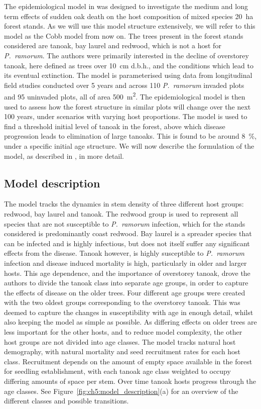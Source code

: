 The epidemiological model in \citet{cobb_ecosystem_2012} was designed to investigate the medium and long term effects of sudden oak death on the host composition of mixed species \SI{20}{\hectare} forest stands. As we will use this model structure extensively, we will refer to this model as the Cobb model from now on. The trees present in the forest stands considered are tanoak, bay laurel and redwood, which is not a host for \textit{P.~ramorum}. The authors were primarily interested in the decline of overstorey tanoak, here defined as trees over \SI{10}{\cm} d.b.h., and the conditions which lead to its eventual extinction. The model is parameterised using data from longitudinal field studies conducted over 5 years and across 110 \textit{P.~ramorum} invaded plots and 95 uninvaded plots, all of area \SI{500}{\metre\squared}. The epidemiological model is then used to assess how the forest structure in similar plots will change over the next 100 years, under scenarios with varying host proportions. The model is used to find a threshold initial level of tanoak in the forest, above which disease progression leads to elimination of large tanoaks. This is found to be around \SI{8}{\percent}, under a specific initial age structure. We will now describe the formulation of the model, as described in \citet{cobb_ecosystem_2012}, in more detail.

\subsection{Model description}

The model tracks the dynamics in stem density of three different host groups: redwood, bay laurel and tanoak. The redwood group is used to represent all species that are not susceptible to \textit{P.~ramorum} infection, which for the stands considered is predominantly coast redwood. Bay laurel is a spreader species that can be infected and is highly infectious, but does not itself suffer any significant effects from the disease. Tanoak however, is highly susceptible to \textit{P.~ramorum} infection and disease induced mortality is high, particularly in older and larger hosts. This age dependence, and the importance of overstorey tanoak, drove the authors to divide the tanoak class into separate age groups, in order to capture the effects of disease on the older trees. Four different age groups were created with the two oldest groups corresponding to the overstorey tanoak. This was deemed to capture the changes in susceptibility with age in enough detail, whilst also keeping the model as simple as possible. As differing effects on older trees are less important for the other hosts, and to reduce model complexity, the other host groups are not divided into age classes. The model tracks natural host demography, with natural mortality and seed recruitment rates for each host class. Recruitment depends on the amount of empty space available in the forest for seedling establishment, with each tanoak age class weighted to occupy differing amounts of space per stem. Over time tanoak hosts progress through the age classes. See Figure~\ref{fig:ch5:model_description}(a) for an overview of the different classes and possible transitions.

